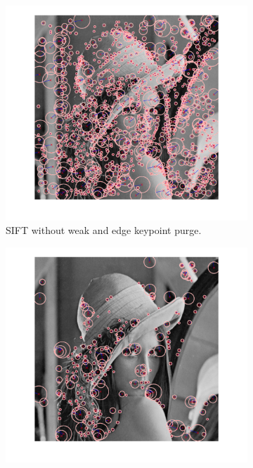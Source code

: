 \documentclass[12pt]{article}
\begin{document}
\begin{figure}[htbp!]
        \centering
        \begin{subfigure}[b]{0.45\textwidth}
                \includegraphics[width=\textwidth]{images/sift2}
                \caption{SIFT without weak and edge keypoint purge.}
                \label{fig:sift1}
        \end{subfigure}
        \begin{subfigure}[b]{0.45\textwidth}
                \includegraphics[width=\textwidth]{images/sift1}

\end{subfigure}
\end{figure}
\end{document}
